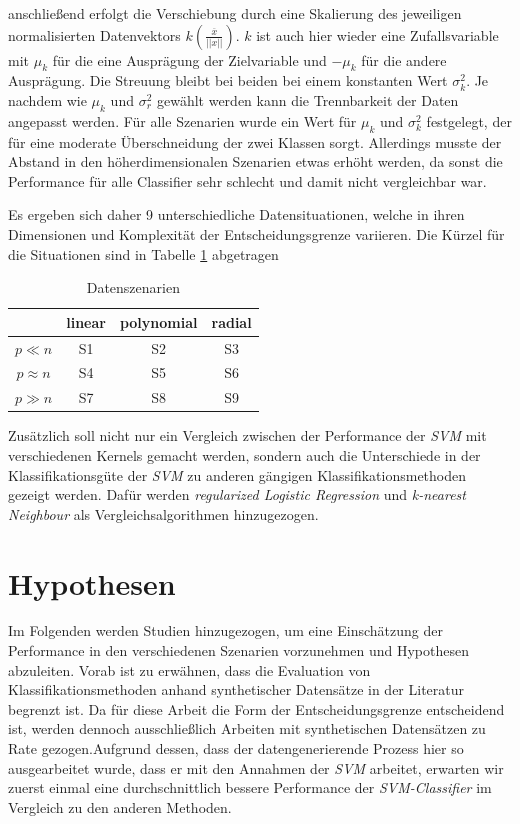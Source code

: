 \documentclass[
]{article}
\begin{document}
anschließend erfolgt die Verschiebung durch eine Skalierung des
jeweiligen normalisierten Datenvektors
\(k\left(\frac{\overline{x}}{||x||}\right)\). \(k\) ist auch hier wieder
eine Zufallsvariable mit \(\mu_k\) für die eine Ausprägung der
Zielvariable und \(-\mu_k\) für die andere Ausprägung. Die Streuung
bleibt bei beiden bei einem konstanten Wert \(\sigma^2_k\). Je nachdem
wie \(\mu_k\) und \(\sigma^2_r\) gewählt werden kann die Trennbarkeit
der Daten angepasst werden. Für alle Szenarien wurde ein Wert für
\(\mu_k\) und \(\sigma^2_k\) festgelegt, der für eine moderate
Überschneidung der zwei Klassen sorgt. Allerdings musste der Abstand in
den höherdimensionalen Szenarien etwas erhöht werden, da sonst die
Performance für alle Classifier sehr schlecht und damit nicht
vergleichbar war.

Es ergeben sich daher 9 unterschiedliche Datensituationen, welche in
ihren Dimensionen und Komplexität der Entscheidungsgrenze variieren. Die
Kürzel für die Situationen sind in Tabelle \ref{tab:datensituationen}
abgetragen

\begin{table}[H]
\begin{center}
\begin{tabular}{ |c|c|c|c| }
 \hline
  & linear & polynomial & radial \\
 \hline
 $p \ll n$ & S1 & S2 & S3 \\
 \hline
 $p \approx n$ & S4 & S5 & S6 \\
 \hline
 $p \gg n$ & S7 & S8 & S9 \\
 \hline
\end{tabular}
\end{center}
\caption{Datenszenarien}
\label{tab:datensituationen}
\end{table}

Zusätzlich soll nicht nur ein Vergleich zwischen der Performance der
\textit{SVM} mit verschiedenen Kernels gemacht werden, sondern auch die
Unterschiede in der Klassifikationsgüte der \textit{SVM} zu anderen
gängigen Klassifikationsmethoden gezeigt werden. Dafür werden
\textit{regularized Logistic Regression} und
\textit{k-nearest Neighbour} als Vergleichsalgorithmen hinzugezogen.

\section{Hypothesen}

Im Folgenden werden Studien hinzugezogen, um eine Einschätzung der
Performance in den verschiedenen Szenarien vorzunehmen und Hypothesen
abzuleiten. Vorab ist zu erwähnen, dass die Evaluation von
Klassifikationsmethoden anhand synthetischer Datensätze in der Literatur
begrenzt ist. Da für diese Arbeit die Form der Entscheidungsgrenze
entscheidend ist, werden dennoch ausschließlich Arbeiten mit
synthetischen Datensätzen zu Rate gezogen.\newline Aufgrund dessen, dass
der datengenerierende Prozess hier so ausgearbeitet wurde, dass er mit
den Annahmen der \textit{SVM} arbeitet, erwarten wir zuerst einmal eine
durchschnittlich bessere Performance der \textit{SVM-Classifier} im
Vergleich zu den anderen Methoden.
\end{document}
